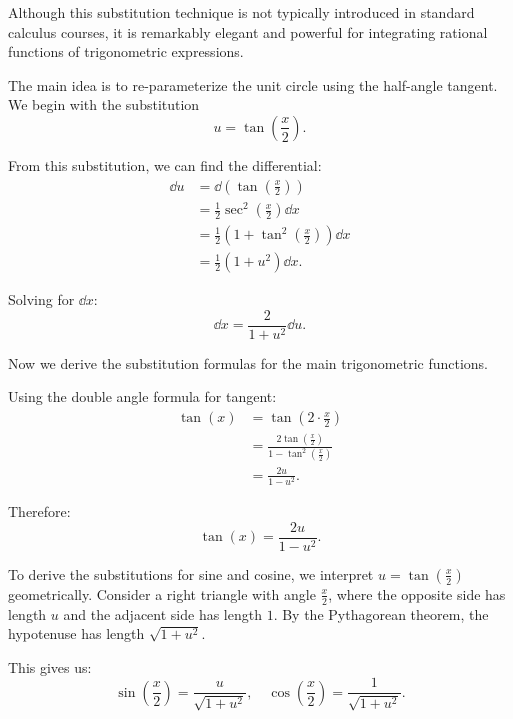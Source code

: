 Although this substitution technique is not typically introduced in standard calculus courses, it is remarkably elegant and powerful for integrating rational functions of trigonometric expressions.

The main idea is to re-parameterize the unit circle using the half-angle tangent. We begin with the substitution 
\begin{equation}
    u = \tan\left( \frac{x}{2} \right). \label{eqn:6/21/25/2}
\end{equation}

From this substitution, we can find the differential:
\begin{align*}
    \dd{u} &= \dd{\left( \tan\left( \frac{x}{2} \right) \right)} \\
    &= \frac{1}{2} \sec^2\left( \frac{x}{2} \right) \dd{x}\\
    &= \frac{1}{2} \left( 1+ \tan^2\left( \frac{x}{2} \right) \right) \dd{x}\\
    &= \frac{1}{2} \left( 1+u^2 \right) \dd{x}.
\end{align*}

Solving for $\dd{x}$:
\begin{equation}
    \boxed{ \dd{x} = \frac{2}{1 +u^2} \dd{u}}. \label{eqn:6/21/25/3}
\end{equation}

Now we derive the substitution formulas for the main trigonometric functions.


Using the double angle formula for tangent:
\begin{align*}
    \tan(x) &= \tan\left( 2 \cdot \frac{x}{2} \right)\\
    &= \frac{2\tan\left( \frac{x}{2} \right)}{1 - \tan^2\left( \frac{x}{2} \right)}\\
    &= \frac{2u}{1-u^2}.
\end{align*}

Therefore:
\begin{equation}
    \boxed{ \tan(x) = \frac{2u}{1-u^2} }. \label{eqn:6/21/25/4}
\end{equation}


To derive the substitutions for sine and cosine, we interpret $u = \tan\left( \frac{x}{2} \right)$ geometrically. Consider a right triangle with angle $\frac{x}{2}$, where the opposite side has length $u$ and the adjacent side has length $1$. By the Pythagorean theorem, the hypotenuse has length $\sqrt{1+u^2}$.

This gives us:
\[ \sin\left( \frac{x}{2} \right) = \frac{u}{\sqrt{1+u^2}}, \quad \cos\left( \frac{x}{2} \right) = \frac{1}{\sqrt{1+u^2}}. \]

